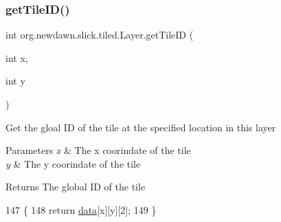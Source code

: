 \mbox{\label{classorg_1_1newdawn_1_1slick_1_1tiled_1_1_layer_a3930aabf5f88cef45dad40439dc44f19}} 
\subsubsection{\texorpdfstring{get\+Tile\+I\+D()}{getTileID()}}
{\footnotesize\ttfamily int org.\+newdawn.\+slick.\+tiled.\+Layer.\+get\+Tile\+ID (\begin{DoxyParamCaption}\item[{int}]{x,  }\item[{int}]{y }\end{DoxyParamCaption})\hspace{0.3cm}{\ttfamily [inline]}}

Get the gloal ID of the tile at the specified location in this layer


\begin{DoxyParams}{Parameters}
{\em x} & The x coorindate of the tile \\
\hline
{\em y} & The y coorindate of the tile \\
\hline
\end{DoxyParams}
\begin{DoxyReturn}{Returns}
The global ID of the tile 
\end{DoxyReturn}

\begin{DoxyCode}
147                                        \{
148         \textcolor{keywordflow}{return} \mbox{\hyperlink{classorg_1_1newdawn_1_1slick_1_1tiled_1_1_layer_a9370f031c215f22f2b18135d8ca5cbc8}{data}}[x][y][2];
149     \}
\end{DoxyCode}
\mbox{\label{classorg_1_1newdawn_1_1slick_1_1tiled_1_1_layer_a25e1b0f9ec38e79ca80defa8b05f9218}} 
